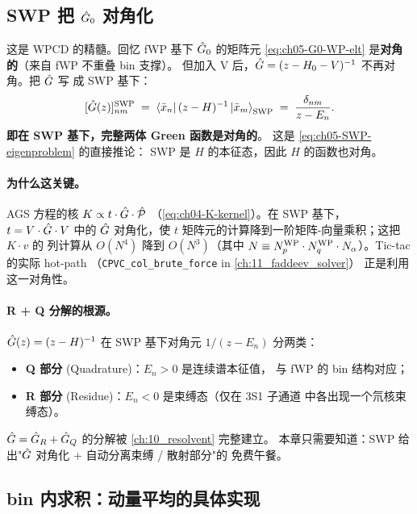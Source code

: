 \subsection{SWP 把 \(\hat{G}_0\) 对角化}
\label{subsec:ch05-SWP-G0-diag}

这是 WPCD 的精髓。回忆 fWP 基下 \(\hat{G}_0\) 的矩阵元
\cref{eq:ch05-G0-WP-elt} 是\textbf{对角的}（来自 fWP 不重叠 bin 支撑）。
但加入 V 后，\(\hat{G} = (z - H_0 - V)^{-1}\) 不再对角。把 \(\hat{G}\) 写
成 SWP 基下：
\begin{equation}
\label{eq:ch05-G-SWP}
[\hat{G}(z)]_{nm}^{\rm SWP}
\;=\;
\bra{\bar{x}_n}(z - H)^{-1}\ket{\bar{x}_m}_{\rm SWP}
\;=\;
\frac{\delta_{nm}}{z - E_n}.
\end{equation}
\textbf{即在 SWP 基下，完整两体 Green 函数是对角的}。
这是 \cref{eq:ch05-SWP-eigenproblem} 的直接推论：
SWP 是 \(H\) 的本征态，因此 \(H\) 的函数也对角。

\paragraph{为什么这关键。}
AGS 方程的核 \(K \propto t \cdot \hat{G} \cdot \hat{\mathcal{P}}\)
（\cref{eq:ch04-K-kernel}）。在 SWP 基下，
\(t = V \cdot \hat{G} \cdot V\) 中的 \(\hat{G}\) 对角化，使
\(t\) 矩阵元的计算降到一阶矩阵-向量乘积；这把 \(K \cdot v\) 的
列计算从 \(O(N^4)\) 降到 \(O(N^3)\)（其中 \(N \equiv {N_{p}^{\text{WP}}} \cdot
{N_{q}^{\text{WP}}} \cdot N_\alpha\)）。Tic-tac 的实际 hot-path
（\texttt{CPVC\_col\_brute\_force} in \cref{ch:11_faddeev_solver}）
正是利用这一对角性。

\paragraph{R + Q 分解的根源。}
\(\hat{G}(z) = (z - H)^{-1}\) 在 SWP 基下对角元 \(1/(z - E_n)\) 分两类：
\begin{itemize}
  \item \textbf{Q 部分} (Quadrature)：\(E_n > 0\) 是连续谱本征值，
        与 fWP 的 bin 结构对应；
  \item \textbf{R 部分} (Residue)：\(E_n < 0\) 是束缚态（仅在 3S1 子通道
        中各出现一个氘核束缚态）。
\end{itemize}
\(\hat{G} = \hat{G}_R + \hat{G}_Q\) 的分解被 \cref{ch:10_resolvent} 完整建立。
本章只需要知道：SWP 给出"\(\hat{G}\) 对角化 + 自动分离束缚 / 散射部分"的
免费午餐。

\subsection{bin 内求积：动量平均的具体实现}
\label{subsec:ch05-quadrature}


